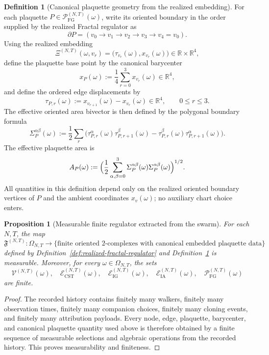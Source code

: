 \documentclass[11pt]{article}
\newtheorem{proposition}[theorem]{Proposition}
\theoremstyle{definition}
\newtheorem{definition}[theorem]{Definition}
\theoremstyle{remark}
\newcommand{\R}{\mathbb R}
\newcommand{\mcE}{\mathcal E}
\newcommand{\mcP}{\mathcal P}
\newcommand{\mcV}{\mathcal V}
\begin{document}
\begin{definition}[Canonical plaquette geometry from the realized embedding]
\label{def:fractal-plaquette-geometry}
For each plaquette \(P\in\mcP_{\mathrm{FG}}^{(N,T)}(\omega)\), write its
oriented boundary in the order supplied by the realized Fractal regulator as
\[
\partial P=(v_0\to v_1\to v_2\to v_3\to v_4=v_0).
\]
Using the realized embedding
\[
\Xi^{(N,T)}(\omega,v_r)=\bigl(\tau_{v_r}(\omega),x_{v_r}(\omega)\bigr)\in\R\times\R^4,
\]
define the plaquette base point by the canonical barycenter
\[
x_P(\omega):=\frac14\sum_{r=0}^3 x_{v_r}(\omega)\in\R^4,
\]
and define the ordered edge displacements by
\[
\tau_{P,r}(\omega):=x_{v_{r+1}}(\omega)-x_{v_r}(\omega)\in\R^4,
\qquad 0\le r\le 3.
\]
The effective oriented area bivector is then defined by the polygonal boundary
formula
\[
\Sigma_P^{\alpha\beta}(\omega)
:=
\frac12\sum_{r}
\bigl(
\tau_{P,r}^{\alpha}(\omega)\tau_{P,r+1}^{\beta}(\omega)
-\tau_{P,r}^{\beta}(\omega)\tau_{P,r+1}^{\alpha}(\omega)
\bigr).
\]
The effective plaquette area is
\[
A_P(\omega)
:=
\Bigl(
\frac12\sum_{\alpha,\beta=0}^3
\Sigma_P^{\alpha\beta}(\omega)\Sigma_P^{\alpha\beta}(\omega)
\Bigr)^{1/2}.
\]
All quantities in this definition depend only on the realized oriented boundary
vertices of \(P\) and the ambient coordinates \(x_v(\omega)\); no auxiliary
chart choice enters.
\end{definition}

\begin{proposition}[Measurable finite regulator extracted from the swarm]
\label{prop:fractal-regulator-measurable}
For each \(N,T\), the map
\[
\mathfrak F^{(N,T)}:\Omega_{N,T}\to
\{\text{finite oriented \(2\)-complexes with canonical embedded plaquette data}\}
\]
defined by Definition~\ref{def:realized-fractal-regulator} and
Definition~\ref{def:fractal-plaquette-geometry} is measurable. Moreover, for
every \(\omega\in\Omega_{N,T}\), the sets
\[
\mcV^{(N,T)}(\omega),\quad
\mcE_{\mathrm{CST}}^{(N,T)}(\omega),\quad
\mcE_{\mathrm{IG}}^{(N,T)}(\omega),\quad
\mcE_{\mathrm{IA}}^{(N,T)}(\omega),\quad
\mcP_{\mathrm{FG}}^{(N,T)}(\omega)
\]
are finite.
\end{proposition}

\begin{proof}
The recorded history contains finitely many walkers, finitely many observation
times, finitely many companion choices, finitely many cloning events, and
finitely many attribution payloads. Every node, edge, plaquette, barycenter,
and canonical plaquette quantity used above is therefore obtained by a finite
sequence of measurable selections and algebraic operations from the recorded
history.
This proves measurability and finiteness.
\end{proof}
\end{document}
